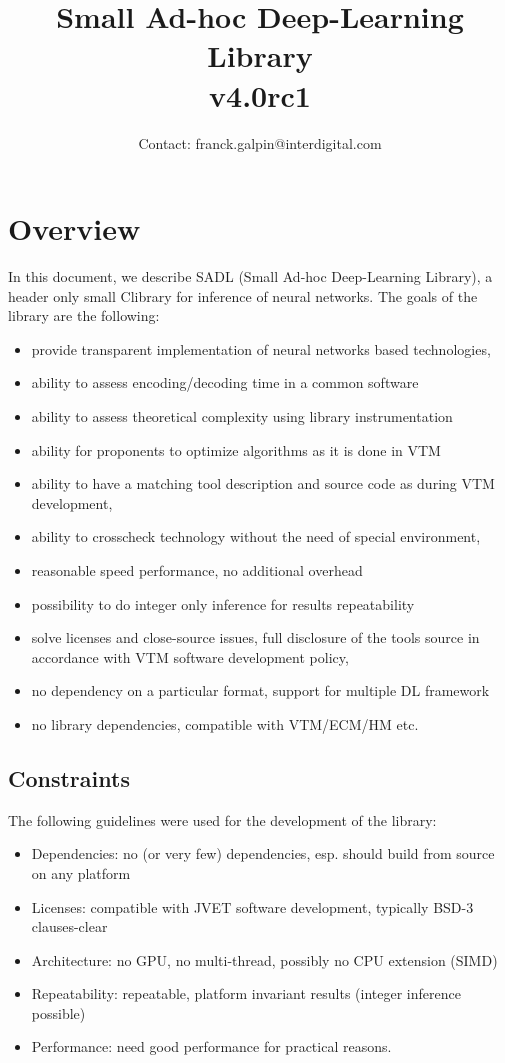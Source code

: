 \documentclass[10pt,a4paper]{article}
\title{Small Ad-hoc Deep-Learning Library\\{ \normalsize v4.0rc1}}
\date{}
\author{Contact: franck.galpin@interdigital.com}
\newcommand{\CC}{C\nolinebreak\hspace{-.05em}\raisebox{.4ex}{\tiny\bf +}\nolinebreak\hspace{-.10em}\raisebox{.4ex}{\tiny\bf +}}
\def\CC{{C\nolinebreak[4]\hspace{-.05em}\raisebox{.4ex}{\tiny\bf ++}}}
\begin{document}
\maketitle
\section{Overview}
In this document, we describe SADL (Small Ad-hoc Deep-Learning Library), a header only small \CC library for inference of neural networks. The goals of the library are the following:
\begin{itemize}
\item provide transparent implementation of neural networks based technologies, 
\item ability to assess encoding/decoding time in a common software
\item ability to assess theoretical complexity using library instrumentation
\item ability for proponents to optimize algorithms as it is done in VTM
\item ability to have a matching tool description and source code as during VTM development,
\item ability to crosscheck technology without the need of special environment,
\item reasonable speed performance, no additional overhead
\item possibility to do integer only inference for results repeatability
\item solve licenses and close-source issues, full disclosure of the tools source in accordance with VTM software development policy,
\item no dependency on a particular format, support for multiple DL framework
\item no library dependencies, compatible with VTM/ECM/HM etc.
\end{itemize}
    
\subsection{Constraints}
The following guidelines were used for the development of the library:
\begin{itemize}
\item Dependencies: no (or very few) dependencies, esp. should build from source on any platform
\item Licenses: compatible with JVET software development, typically BSD-3 clauses-clear
\item Architecture: no GPU, no multi-thread, possibly no CPU extension (SIMD)
\item Repeatability: repeatable, platform invariant results (integer inference possible)
\item  Performance: need good performance for practical reasons.
\end{itemize}
\end{document}
